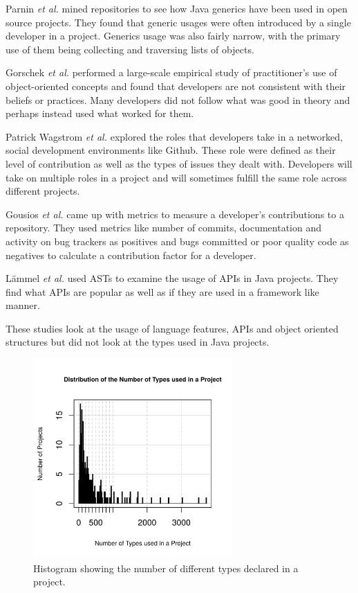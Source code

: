 \documentclass{sig-alternate-05-2015}
\begin{document}
Parnin \textit{et al.} \cite{Parnin:2011:JGA:1985441.1985446} mined repositories to see how Java generics have been used in open source projects. They found that generic usages were often introduced by a single developer in a project. Generics usage was also fairly narrow, with the primary use of them being collecting and traversing lists of objects.

Gorschek \textit{et al.} \cite{Gorschek:2010:LES:1806799.1806820} performed a large-scale empirical study of practitioner's use of object-oriented concepts and found that developers are not consistent with their beliefs or practices. Many developers did not follow what was good in theory and perhaps instead used what worked for them.

Patrick Wagstrom \textit{et al.} \cite{Patrick:Wagstrom:2012} explored the roles that developers take in a networked, social development environments like Github. These role were defined as their level of contribution as well as the types of issues they dealt with. Developers will take on multiple roles in a project and will sometimes fulfill the same role across different projects.

Gousios \textit{et al.} \cite{KGSP09} came up with metrics to measure a developer's contributions to a repository. They used metrics like number of commits, documentation and activity on bug trackers as positives and bugs committed or poor quality code as negatives to calculate a contribution factor for a developer.

L\"{a}mmel \textit{et al.} \cite{Lammel:2011:LAA:1982185.1982471} used ASTs to examine the usage of APIs in Java projects. They find what APIs are popular as well as if they are used in a framework like manner. 

These studies look at the usage of language features, APIs and object oriented structures but did not look at the types used in Java projects.

\begin{figure}[t]
\centering
\includegraphics[height=3in, width=3in]{../lib_stats_number_of_libraries_dist}
\caption{Histogram showing the number of different types declared in a project.}
\label{lib_stats_number_of_libraries_dist}
\end{figure}
\end{document}
